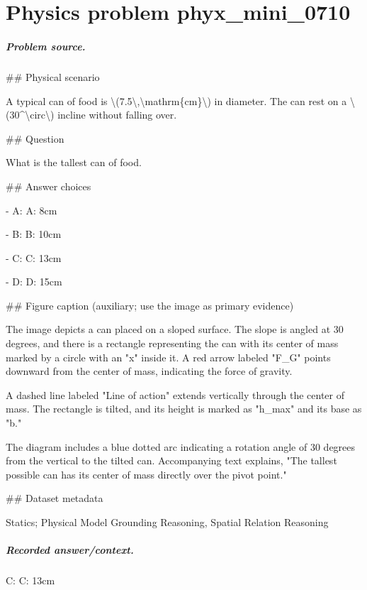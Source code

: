 
\chapter{Physics problem phyx\_mini\_0710}
\label{ch:PhyXMiniProblems_problem_phyx_mini_0710}

\paragraph{Problem source.}
\#\# Physical scenario

A typical can of food is \textbackslash{}(7.5\textbackslash{},\textbackslash{}mathrm\{cm\}\textbackslash{}) in diameter. The can rest on a \textbackslash{}(30\textasciicircum{}\textbackslash{}circ\textbackslash{}) incline without falling over.

\#\# Question

What is the tallest can of food.

\#\# Answer choices

- A: A: 8cm

- B: B: 10cm

- C: C: 13cm

- D: D: 15cm

\#\# Figure caption (auxiliary; use the image as primary evidence)

The image depicts a can placed on a sloped surface. The slope is angled at 30 degrees, and there is a rectangle representing the can with its center of mass marked by a circle with an "x" inside it. A red arrow labeled "F⃗\_G" points downward from the center of mass, indicating the force of gravity.

A dashed line labeled "Line of action" extends vertically through the center of mass. The rectangle is tilted, and its height is marked as "h\_max" and its base as "b."

The diagram includes a blue dotted arc indicating a rotation angle of 30 degrees from the vertical to the tilted can. Accompanying text explains, "The tallest possible can has its center of mass directly over the pivot point."

\#\# Dataset metadata

Statics; Physical Model Grounding Reasoning, Spatial Relation Reasoning

\paragraph{Recorded answer/context.}
C: C: 13cm

